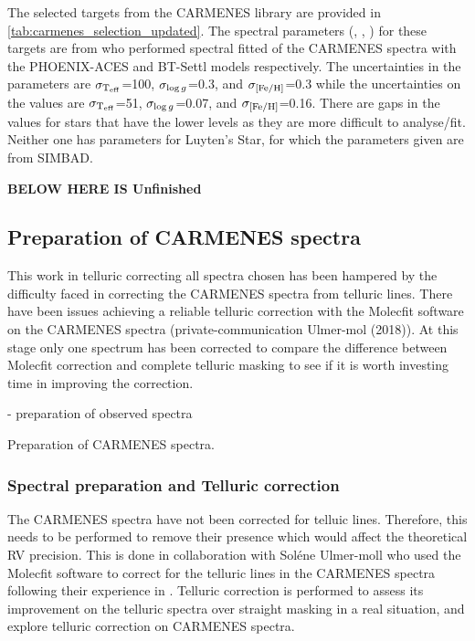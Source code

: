 The selected targets from the {CARMENES} library are provided in \cref{tab:carmenes_selection_updated}.
The spectral parameters (\Teff{}, \Logg{}, \feh{}) for these targets are from \citep{passegger_carmenes_2018, rajpurohit_exploring_2018} who performed spectral fitted of the {CARMENES} spectra with the {PHOENIX-ACES} and {BT-Settl} models respectively.
The uncertainties in the \citet{rajpurohit_exploring_2018} parameters are \(\sigma_{\textrm{T}_{\mathrm{eff}}{}}\)=100\K{}, \(\sigma_{\log{g}{}}\)=0.3, and \(\sigma_{\feh{}}\)=0.3 while the uncertainties on the 
\citep{passegger_carmenes_2018} values are \(\sigma_{\textrm{T}_{\mathrm{eff}}{}}\)=51\K{}, \(\sigma_{\log{g}{}}\)=0.07, and \(\sigma_{\feh{}}\)=0.16.
There are gaps in the \citet{passegger_carmenes_2018} values for stars that have the lower \snr{} levels as they are more difficult to analyse/fit.
Neither one has parameters for Luyten's Star, for which the parameters given are from {SIMBAD}.

\begin{landscape}
    
\end{landscape}



\textbf{BELOW HERE IS Unfinished}


\subsection{Preparation of {CARMENES} spectra}
This work in telluric correcting all spectra chosen has been hampered by the difficulty faced in correcting the {CARMENES} spectra from telluric lines.
There have been issues achieving a reliable telluric correction with the Molecfit software on the {CARMENES} spectra (private-communication Ulmer-mol (2018)).
At this stage only one spectrum has been corrected to compare the difference between Molecfit correction and complete telluric masking to see if it is worth investing time in improving the correction.


- preparation of observed spectra

Preparation of {CARMENES} spectra.



\subsubsection{Spectral preparation and Telluric correction}
\label{subsec:prepatation_on_carmenes}
The {CARMENES} spectra have not been corrected for telluic lines.
Therefore, this needs to be performed to remove their presence which would affect the theoretical {RV} precision.
This is done in collaboration with Sol\'ene Ulmer-moll who used the Molecfit software \citep{smette_molecfit_2015} to correct for the telluric lines in the {CARMENES} spectra following their experience in \citet{ulmer-moll_telluric_2018}. 
Telluric correction is performed to assess its improvement on the telluric spectra over straight masking in a real situation, and explore telluric correction on {CARMENES} spectra.
 
